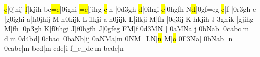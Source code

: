 \temps\notes{}\hl e|\qqh0jhij\enotes
\barre\notes{}\hl f|kjih\enotes
\temps\notes\lh b\zh c\hl{=e}|\qqh0ighi\enotes
\barre\notes{}\hl{=e}|jihg\enotes
\temps\notes{}\hl c|\qu h\sk\enotes
\temps\notes|\Ilegl0d\dqh3gh\enotes
\barre\notes{}\hl d|\qqh0ihgi\enotes
\temps\notes{}\hl c|\qqh0hgfh\enotes
\Alaligne\notes{}\lh N\hl d|\qqh0gf{=e}g\enotes
\temps\notes{}\hl c|\qu f\sk\enotes
\temps\notes{}|\Ilegu0r\dqh3gh\enotes
\barre\notes\bohl e\relax
     |\zq g\qqh0ighi\enotes
\temps\notes\bohl a|\zq h\qqh0jhij\enotes
\barre\notes\bohu M|\zq h\qqh0kijk\enotes
\temps\notes\bohu L|\zq ilkji\enotes
\barre\notes\bohu a|\zq h\qqh0jijk\enotes
\temps\notes\bohu L|\zq ilkji\enotes
\Alaligne\Notes\bohu M|\zq f\qu h\enotes
\temps\notes|\Ilegu0q\dqh3ij\enotes
\temps\notes\bohu K|\zq hkjih\enotes
\barre\notes\bohu J|\qqh3ghik\enotes
\temps\notes{}|\zq gjihg\enotes
\barre\Notes\bohu M|\zq f\qu h\enotes
\temps\notes|\Ilegu0p\dqh3gh\enotes
\temps\notes\bohu K|\zq f\qqh0ihgi\enotes
\barre\notes\bohu J|\zq f\qqh0hgfh\enotes
\temps\notes\bohu J|\qqh0gfeg\enotes
\xbarre\Notes\zq F\ql M|\qu f\enotes
\Zalapage\notes{}\Ilegu0d\dqb3MN\relax
    |\soupir{}\enotes
\temps\notes\qqB0aMNa|\hu j\enotes
\barre\notes\qqB0bNab|\enotes
\temps\notes\qqB0cabc|\hu m\enotes
\barre\notes{}\ql d\sk|\hu m\enotes
\temps\notes\Ilegu0d\dqb4bd|\enotes
\temps\notes\qqB0cbac|\enotes
\barre\notes\qqB0baNb|\zh i\rh j\enotes
\temps\notes\qqB0aNMa|\hu m\enotes
\Alaligne\notes\qqB0NM{=L}N|\hl n\enotes
\temps\notes{}\ql M\sk|\hl o\enotes
\temps\notes\Ilegl0F\dqb3Na|\enotes
\barre\notes{}\qqB0bNab\relax
     |\hu n\enotes
\temps\notes\qqB0cabc|\hu m\enotes
\barre\notes{}bcd|\hu m\enotes
\temps\notes{}cde|\rh i\enotes
\barre\notes{}f{_e}{_d}c|\hu m\enotes
\temps\notes{}bcde|\hu n\enotes
